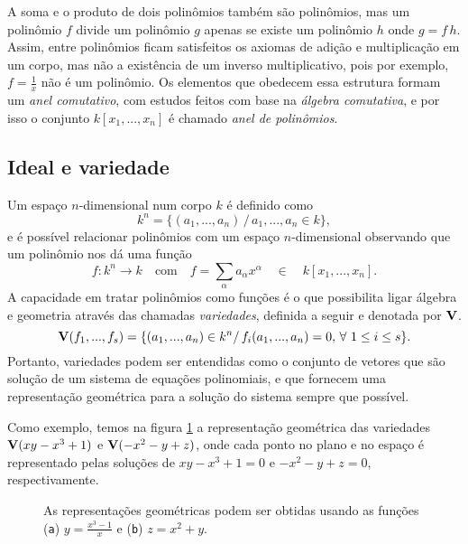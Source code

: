 A soma e o produto de dois polinômios também são polinômios, mas um polinômio $f$ divide um polinômio $g$ apenas se existe um polinômio $h$ onde $g=f\,h$. Assim, entre polinômios ficam satisfeitos os axiomas de adição e multiplicação em um corpo, mas não a existência de um inverso multiplicativo, pois por exemplo, $f=\frac{1}{x}$ não é um polinômio. Os elementos que obedecem essa estrutura formam um {\it anel comutativo}, com estudos feitos com base na {\it álgebra comutativa}, e por isso o conjunto $k[x_1,...,x_n]$ é chamado {\it anel de polinômios}.

\subsection*{Ideal e variedade}
Um espaço $n$-dimensional num corpo $k$ é definido como
\begin{equation*}
k^n=\{(a_1,...,a_n)\,/\, a_1,...,a_n\in k\},
\end{equation*}
e é possível relacionar polinômios com um espaço $n$-dimensional observando que um polinômio nos dá uma função
\begin{equation*}
f:k^n\rightarrow k\quad\text{com}\quad f=\sum_\alpha a_\alpha x^\alpha\quad \in\quad k[x_1,...,x_n].
\end{equation*}
A capacidade em tratar polinômios como funções é o que possibilita ligar álgebra e geometria através das chamadas {\it variedades}, definida a seguir e denotada por ${\bf V}$.
\begin{equation*}
{\bf V}(f_1,...,f_s)=\{(a_1,...,a_n)\in k^n/\, f_i(a_1,...,a_n)=0, \,\forall\,\, 1\le i\le s\}.
\end{equation*}
Portanto, variedades podem ser entendidas como o conjunto de vetores que são solução de um sistema de equações polinomiais, e que fornecem uma representação geométrica para a solução do sistema sempre que possível.

Como exemplo, temos na figura \ref{fig.variedades} a representação geométrica das variedades ${\bf V}(xy-x^3+1)$ e ${\bf V}(-x^2-y+z)$, onde cada ponto no plano e no espaço é representado pelas soluções de $xy-x^3+1=0$ e $-x^2-y+z=0$, respectivamente.
\begin{figure}[!htb]
\centering
{}
\quad
{}
\caption{{As representações geométricas podem ser obtidas usando as funções ({\tt a}) $y=\frac{x^3-1}{x}$ e ({\tt b}) $z=x^2+y$}.}
\label{fig.variedades}
\end{figure} 

